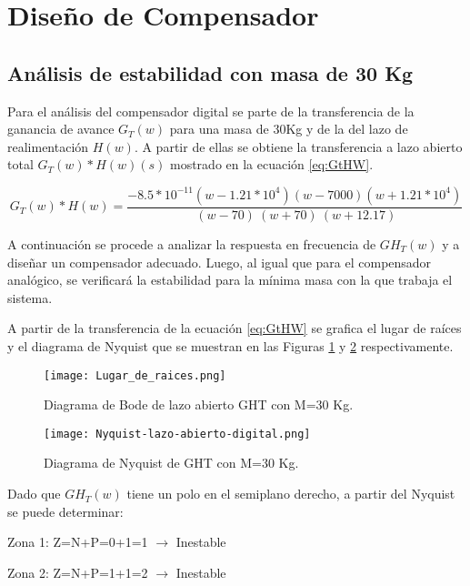 \section{Diseño de Compensador}

\subsection{Análisis de estabilidad con masa de 30 Kg}

\noindent Para el análisis del compensador digital se parte de la transferencia de la ganancia de avance $G_{T}(w)$ para una masa de 30Kg y de la del lazo de realimentación $H(w)$. A partir de ellas se obtiene la transferencia a lazo abierto total $G_{T}(w)*H(w)(s)$ mostrado en la ecuación \ref{eq:GtHW}.
 
\begin{equation}
	\label{eq:GtHW}  
	G_T(w)*H(w)=\frac{-8.5*10^{-11}(w-1.21*10^4)(w-7000)(w+1.21*10^4)}{\ (w-70)\ (w+70)\ (w+12.17)} 
\end{equation} 


\noindent A continuación se procede a analizar la respuesta en frecuencia de $GH_{T}(w)$ y a diseñar un compensador adecuado. Luego, al igual que para el compensador analógico, se verificará la estabilidad para la mínima masa  con la  que trabaja el sistema.

\noindent A partir de la transferencia de la ecuación  \ref{eq:GtHW} se  grafica el lugar de raíces y el diagrama de Nyquist que se muestran en las Figuras \ref{fig:lugar-de-raices} y \ref{fig:nyquist-lazo-abierto-digital} respectivamente.

\begin{figure}[H]
	\centering
	\texttt{[image: Lugar\_de\_raices.png]}
	\caption{Diagrama de Bode de lazo abierto GHT con M=30 Kg.}
	\label{fig:lugar-de-raices}
\end{figure}

\begin{figure}[H]
	\centering
	\texttt{[image: Nyquist-lazo-abierto-digital.png]}
	\caption{Diagrama de Nyquist de GHT con M=30 Kg.}
	\label{fig:nyquist-lazo-abierto-digital}
\end{figure}

\noindent Dado que ${GH}_{T}(w)$ tiene un polo en el semiplano derecho, a partir del Nyquist se puede determinar:

\noindent Zona 1: Z=N+P=0+1=1 $\mathrm{\to}$ Inestable 

\noindent Zona 2: Z=N+P=1+1=2 $\mathrm{\to}$ Inestable

